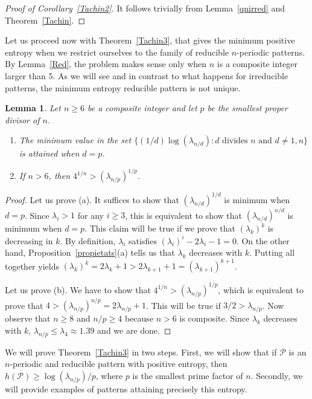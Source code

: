 \documentclass[a4paper]{amsart}
\newtheorem{lemma}[theorem]{Lemma}
\theoremstyle{definition}
\begin{document}
\begin{proof}[Proof of Corollary~\ref{Tachin2}]
It follows trivially from Lemma~\ref{qnirred} and Theorem~\ref{Tachin}.
\end{proof}

Let us proceed now with Theorem~\ref{Tachin3}, that gives the minimum positive entropy when we restrict ourselves to the family
of reducible $n$-periodic patterns. By Lemma~\ref{Red}, the problem makes sense only when $n$ is a composite integer larger than 5.
As we will see and in contrast to what happens for irreducible patterns, the minimum entropy reducible pattern is not unique.

\begin{lemma}\label{minim}
Let $n\ge6$ be a composite integer and let $p$ be the smallest proper divisor of $n$.
\begin{enumerate}
\item The minimum value in the set $\{(1/d)\log(\lambda_{n/d}): d\mbox{ divides $n$ and } d\ne 1,n\}$
is attained when $d=p$.
\item If $n>6$, then $4^{1/n}>(\lambda_{n/p})^{1/p}$.
\end{enumerate}
\end{lemma}
\begin{proof}
Let us prove (a). It suffices to show that $(\lambda_{n/d})^{1/d}$ is minimum when $d=p$. Since $\lambda_i>1$ for any
$i\ge3$, this is equivalent to show that $(\lambda_{n/d})^{n/d}$ is minimum when $d=p$. This claim will be
true if we prove that $(\lambda_k)^k$ is decreasing in $k$. By definition, $\lambda_i$ satisfies $(\lambda_i)^i-2\lambda_i-1=0$.
On the other hand, Proposition~\ref{propietats}(a) tells us that $\lambda_k$ decreases with $k$. Putting all together yields
$(\lambda_k)^k=2\lambda_k+1>2\lambda_{k+1}+1=(\lambda_{k+1})^{k+1}$.

Let us prove (b). We have to show that $4^{1/n}>(\lambda_{n/p})^{1/p}$, which is equivalent to prove that
$4>(\lambda_{n/p})^{n/p}=2\lambda_{n/p}+1$. This will be true if $3/2>\lambda_{n/p}$. Now observe that
$n\ge8$ and $n/p\ge4$ because $n>6$ is composite. Since $\lambda_k$ decreases with $k$,
$\lambda_{n/p}\le\lambda_4\approx1.39$ and we are done.
\end{proof}

We will prove Theorem~\ref{Tachin3} in two steps. First, we will show that if $\mathcal{P}$ is an $n$-periodic and
reducible pattern with positive entropy, then $h(\mathcal{P})\ge\log(\lambda_{n/p})/p$, where $p$ is the smallest prime factor of $n$.
Secondly, we will provide examples of patterns attaining precisely this entropy.
\end{document}
